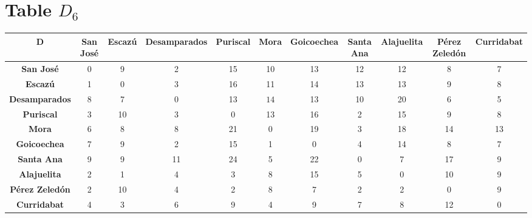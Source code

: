 \documentclass{article}
\begin{document}
\section{Table $D_{6}$}
\begin{center}
    \begin{tabular}{|c||c|c|c|c|c|c|c|c|c|c|}
        \hline
        \textbf{D} & \textbf{San José} & \textbf{Escazú} & \textbf{Desamparados} & \textbf{Puriscal} & \textbf{Mora} & \textbf{Goicoechea} & \textbf{Santa Ana} & \textbf{Alajuelita} & \textbf{Pérez Zeledón} & \textbf{Curridabat} \\
        \hline
        \hline
        \textbf{San José}& 0 & 9 & 2 & 15 & 10 & 13 & 12 & 12 & 8 & 7 \\
        \hline
        \textbf{Escazú}& 1 & 0 & 3 & 16 & 11 & 14 & 13 & 13 & 9 & 8 \\
        \hline
        \textbf{Desamparados}& 8 & 7 & 0 & 13 & \cellcolor[HTML]{D74894}$14$ & 13 & 10 & 20 & 6 & 5 \\
        \hline
        \textbf{Puriscal}& 3 & 10 & 3 & 0 & 13 & 16 & 2 & 15 & 9 & 8 \\
        \hline
        \textbf{Mora}& 6 & 8 & 8 & 21 & 0 & 19 & 3 & 18 & 14 & 13 \\
        \hline
        \textbf{Goicoechea}& 7 & 9 & 2 & 15 & 1 & 0 & 4 & 14 & 8 & 7 \\
        \hline
        \textbf{Santa Ana}& 9 & 9 & 11 & 24 & 5 & 22 & 0 & 7 & 17 & 9 \\
        \hline
        \textbf{Alajuelita}& 2 & 1 & 4 & 3 & 8 & 15 & 5 & 0 & 10 & 9 \\
        \hline
        \textbf{Pérez Zeledón}& 2 & 10 & 4 & 2 & \cellcolor[HTML]{D74894}$8$ & 7 & 2 & 2 & 0 & 9 \\
        \hline
        \textbf{Curridabat}& 4 & 3 & 6 & 9 & 4 & 9 & 7 & 8 & 12 & 0 \\
        \hline
    \end{tabular}
\end{center}
\end{document}
